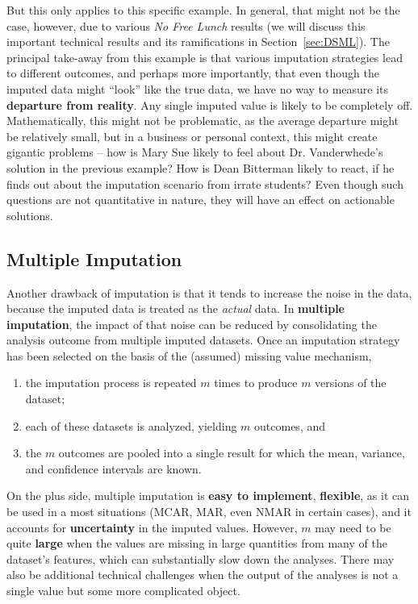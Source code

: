 \newl
But this only applies to this specific example. In general, that might not be the case, however, due to various \textit{No Free Lunch} results (we will discuss this important technical results and its ramifications in Section~\ref{sec:DSML}). The principal take-away from this example is that various imputation strategies lead to different outcomes, and perhaps more importantly, that even though the imputed data might ``look'' like the true data, we have no way to measure its \textbf{departure from reality}. Any single imputed value is likely to be completely off. Mathematically, this might not be problematic, as the average departure might be relatively small, but in a business or personal context, this might create gigantic problems  -- how is Mary Sue likely to feel about Dr. Vanderwhede's solution in the previous example? How is Dean Bitterman likely to react, if he finds out about the imputation scenario from irrate students? Even though such questions are not quantitative in nature, they will have an effect on actionable solutions.  
\subsection{Multiple Imputation}
Another drawback of imputation is that it tends to increase the noise in the data, because the imputed data is treated as the \textit{actual} data. In \textbf{multiple imputation}, the impact of that noise can be reduced by consolidating the analysis outcome from multiple imputed datasets. Once an imputation strategy has been selected on the basis of the (assumed) missing value mechanism, 
\begin{enumerate}[noitemsep]
\item the imputation process is repeated $m$ times to produce $m$ versions of the dataset;
\item each of these datasets is analyzed, yielding $m$ outcomes, and  
\item the $m$ outcomes are pooled into a single result for which the mean, variance, and confidence intervals are known.
\end{enumerate}
On the plus side, multiple imputation is \textbf{easy to implement}, \textbf{flexible}, as it can  be used in a most situations (MCAR, MAR, even NMAR in certain cases), and it accounts for \textbf{uncertainty} in the imputed values. However, $m$ may need to be quite \textbf{large} when the values are missing in large quantities from many of the dataset's features, which can substantially slow down the analyses. There may also be additional technical challenges when the output of the analyses is not a single value but some more complicated object.

